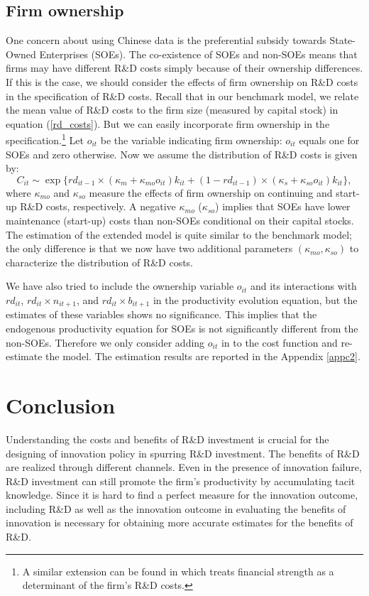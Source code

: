 \documentclass[11pt]{article}
\begin{document}
\subsection{Firm ownership}
One concern about using Chinese data is the preferential subsidy towards State-Owned Enterprises (SOEs). The co-existence of SOEs and non-SOEs means that firms may have different R\&D costs simply because of their ownership differences. If this is the case, we should consider the effects of firm ownership on R\&D costs in the specification of R\&D costs. Recall that in our benchmark model, we relate the mean value of R\&D costs to the firm size (measured by capital stock) in equation (\ref{rd_costs}). But we can easily incorporate firm ownership in the specification.\footnote{A similar extension can be found in \cite{Peters2016} which treats financial strength as a determinant of the firm's R\&D costs.} Let $o_{it}$ be the variable indicating firm ownership: $o_{it}$ equals one for SOEs and zero otherwise. Now we assume the distribution of R\&D costs is given by:
\begin{equation} \label{rd_costs_ext}
    C_{it}\sim \exp\{rd_{it-1}\times(\kappa_m+\kappa_{mo} o_{it}) k_{it}+(1-rd_{it-1})\times(\kappa_s +\kappa_{so} o_{it})k_{it}\},
\end{equation}
where $\kappa_{mo}$ and $\kappa_{so}$ measure the effects of firm ownership on continuing and start-up R\&D costs, respectively. A negative $\kappa_{mo}$ ($\kappa_{so}$) implies that SOEs have lower maintenance (start-up) costs than non-SOEs conditional on their capital stocks. The estimation of the extended model is quite similar to the benchmark model; the only difference is that we now have two additional parameters $(\kappa_{mo}, \kappa_{so})$ to characterize the distribution of R\&D costs. 

We have also tried to include the ownership variable $o_{it}$ and its interactions with $rd_{it}$, $rd_{it}\times n_{it+1}$, and $rd_{it}\times b_{it+1}$ in the productivity evolution equation, but the estimates of these variables shows no significance. This implies that the endogenous productivity equation for SOEs is not significantly different from the non-SOEs. Therefore we only consider adding $o_{it}$ in to the cost function and re-estimate the model. The estimation results are reported in the Appendix \ref{appc2}. 


\section{Conclusion}
Understanding the costs and benefits of R\&D investment is crucial for the designing of innovation policy in spurring R\&D investment. The benefits of R\&D are realized through different channels. Even in the presence of innovation failure, R\&D investment can still promote the firm's productivity by accumulating tacit knowledge. Since it is hard to find a perfect measure for the innovation outcome, including R\&D as well as the innovation outcome in evaluating the benefits of innovation is necessary for obtaining more accurate estimates for the benefits of R\&D. 
\end{document}
